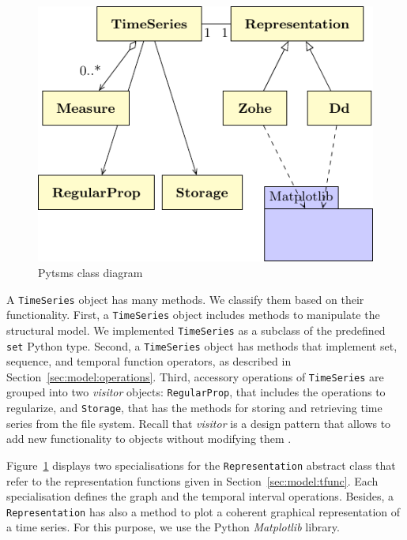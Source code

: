 \begin{figure}[tp]
  \centering
  \includegraphics{fig_pytsms_uml.pdf}
  \caption{Pytsms  class diagram}
  \label{fig:implementacio:pytsms-uml}
\end{figure}

A \texttt{TimeSeries} object has many methods. We classify them based
on their functionality. First, a \texttt{TimeSeries} object includes
methods to manipulate the structural model. We implemented
\texttt{TimeSeries} as a subclass of the predefined \texttt{set}
Python type. Second, a \texttt{TimeSeries} object has methods that
implement set, sequence, and temporal function operators, as described
in Section~\ref{sec:model:operations}.  Third, accessory operations of
\texttt{TimeSeries} are grouped into two \emph{visitor}
objects: \texttt{RegularProp}, that includes the operations to
regularize, and \texttt{Storage}, that has the methods for storing and
retrieving time series from the file system. Recall that
\emph{visitor} is a design pattern that allows to add new
functionality to objects without modifying them
\cite{ziade08:expert_python_programming:visitor,martin02:visitor}.

Figure~\ref{fig:implementacio:pytsms-uml} displays two specialisations
for the \texttt{Representation} abstract class that refer to the
representation functions given in Section~\ref{sec:model:tfunc}. Each
specialisation defines the graph and the temporal interval
operations. Besides, a \texttt{Representation} has also a method to
plot a coherent graphical representation of a time series. For this
purpose, we use the Python \emph{Matplotlib} library.

